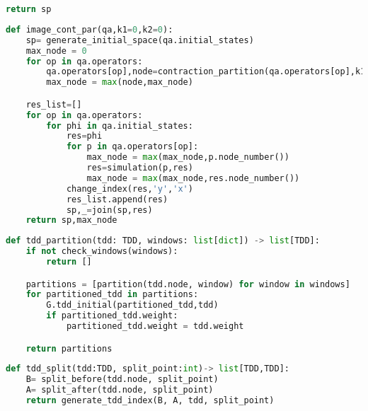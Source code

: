{\begin{lstlisting}[language=Python, caption=对量子线路应用addition优化方案]
    return sp
\end{lstlisting}
\begin{lstlisting}[language=Python, caption=对量子线路应用contraction优化方案]
def image_cont_par(qa,k1=0,k2=0):
    sp= generate_initial_space(qa.initial_states)
    max_node = 0
    for op in qa.operators:
        qa.operators[op],node=contraction_partition(qa.operators[op],k1,k2)
        max_node = max(node,max_node)

    res_list=[]
    for op in qa.operators:
        for phi in qa.initial_states:
            res=phi
            for p in qa.operators[op]:
                max_node = max(max_node,p.node_number())
                res=simulation(p,res)
                max_node = max(max_node,res.node_number())
            change_index(res,'y','x')
            res_list.append(res)
            sp,_=join(sp,res)
    return sp,max_node
\end{lstlisting}
\begin{lstlisting}[language=Python, caption=对TDD运用窗函数划分]
def tdd_partition(tdd: TDD, windows: list[dict]) -> list[TDD]:
    if not check_windows(windows):
        return []

    partitions = [partition(tdd.node, window) for window in windows]
    for partitioned_tdd in partitions:
        G.tdd_initial(partitioned_tdd,tdd)
        if partitioned_tdd.weight:
            partitioned_tdd.weight = tdd.weight

    return partitions
\end{lstlisting}
\begin{lstlisting}[language=Python, caption=对TDD进行分割]
def tdd_split(tdd:TDD, split_point:int)-> list[TDD,TDD]:
    B= split_before(tdd.node, split_point)
    A= split_after(tdd.node, split_point)
    return generate_tdd_index(B, A, tdd, split_point)
\end{lstlisting}
\thispagestyle{appendixheader}
}